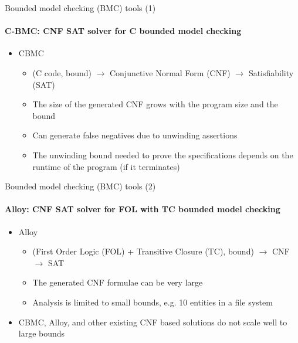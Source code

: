 \begin{frame}{Bounded model checking (BMC) tools (1) }
  \framesubtitle{C-BMC: CNF SAT solver for C bounded model checking} 
  \begin{itemize}
  	\item
	 CBMC~\cite{clarke2004tool} 
	\begin{itemize}
	 \item
	 (C code, bound) $\rightarrow$ Conjunctive Normal Form (CNF) $\rightarrow$ Satisfiability (SAT)
	 \item
	  The size of the generated CNF grows with the program size and the bound
	 \item
	  Can generate false negatives due to unwinding assertions 
  \item
    The unwinding bound needed to prove the specifications depends on the runtime of the program (if it terminates)
	\end{itemize}
\end{itemize}
\end{frame}

\begin{frame}{Bounded model checking (BMC) tools (2) }
  \framesubtitle{Alloy: CNF SAT solver for FOL with TC bounded model checking} 
  \begin{itemize}
	\item 
 Alloy~\cite{jackson2002alloy}
	 \begin{itemize}
  \item 
	  (First Order Logic (FOL) + Transitive Closure (TC), bound) $\rightarrow$ CNF $\rightarrow$ SAT
	  \item The generated CNF formulae can be very large 
	  \item Analysis is limited to small bounds, e.g. 10 entities in a file system~\cite{fz2007relational}
	 \end{itemize}
	 \item 
  CBMC, Alloy, and other existing CNF based solutions do not scale well to large bounds
 \end{itemize}
\end{frame}

